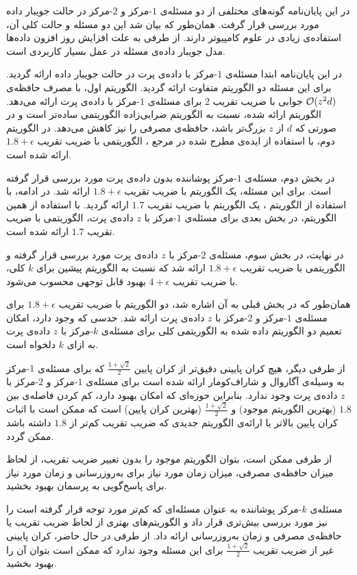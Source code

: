 

در این پایان‌نامه گونه‌های مختلفی از دو مسئله‌ی $1$-مرکز‌ و $2$-مرکز در حالت‌ جویبار داده  مورد بررسی قرار گرفت. همان‌طور که بیان شد این دو مسئله و حالت کلی آن، استفاده‌ی زیادی در علوم کامپیوتر دارند. از طرفی به علت افزایش روز افزون داده‌ها مدل‌ جویبار داده‌ی مسئله در عمل بسیار کاربردی است.

در این پایان‌نامه ابتدا مسئله‌ی $1$-مرکز با داده‌ی پرت در حالت جویبار داده ارائه گردید. برای این مسئله دو الگوریتم متفاوت ارائه گردید. الگوریتم اول، با مصرف حافظه‌ی $\mathcal{O}(z^2d)$ جوابی با ضریب تقریب $2$ برای مسئله‌ی $1$-مرکز با داده‌ی پرت ارائه می‌دهد. الگوریتم ارائه شده، نسبت به الگوریتم ضرابی‌زاده  الگوریتمی ساده‌تر است و در صورتی که $d$ از $z$ بزرگ‌تر باشد، حافظه‌ی مصرفی را نیز کاهش می‌دهد. در الگوریتم دوم، با استفاده از ایده‌ی مطرح شده در مرجع ، الگوریتمی با ضریب تقریب $1.8 + \epsilon$ ارائه شده است.

در بخش دوم، مسئله‌ی $1$-مرکز پوشاننده بدون داده‌ی پرت مورد بررسی قرار گرفته است. برای این مسئله، یک الگوریتم با ضریب تقریب $1.8 + \epsilon$ ارائه شد. در ادامه، با استفاده از الگوریتم ، یک الگوریتم با ضریب تقریب $1.7$ ارائه گردید. با استفاده از همین الگوریتم، در بخش بعدی برای مسئله‌ی $1$-مرکز با $z$ داده‌ی پرت، الگوریتمی با ضریب تقریب $1.7$ ارائه شده است.

در نهایت، در بخش سوم، مسئله‌ی $2$-مرکز با $z$ داده‌ی پرت مورد بررسی قرار گرفته و الگوریتمی با ضریب تقریب $1.8 + \epsilon$ ارائه شد که نسبت به الگوریتم پیشین برای $k$ کلی، با ضریب تقریب $4 + \epsilon$ بهبود قابل توجهی محسوب می‌شود.


همان‌طور که در بخش قبلی به آن اشاره شد، دو الگوریتم با ضریب تقریب $1.8 + \epsilon$ برای مسئله‌ی $1$-مرکز و $2$-مرکز با $z$ داده‌ی پرت ارائه شد.
حدسی که وجود دارد، امکان تعمیم دو الگوریتم داده شده به الگوریتمی کلی برای مسئله‌ی $k$-مرکز با $z$ داده‌ی پرت به ازای $k$ دلخواه است.

از طرفی دیگر، هیچ کران پایینی دقیق‌تر از کران پایین $\frac{1 + \sqrt{2}}{2}$ که برای مسئله‌ی $1$-مرکز به وسیله‌ی آگاروال و شاراف‌کومار ارائه شده است  برای مسئله‌ی $1$-مرکز و $2$-مرکز با $z$ داده‌ی پرت وجود ندارد.
بنابراین حوزه‌ای که امکان بهبود دارد، کم کردن فاصله‌ی بین $1.8$ (بهترین الگوریتم موجود) و $\frac{1 + \sqrt{2}}{2}$ (بهترین کران پایین) است که ممکن است با اثبات کران پایین بالا‌تر یا ارائه‌ی الگوریتم جدیدی که ضریب تقریب کم‌تر از $1.8$ داشته باشد ممکن گردد.

از طرفی ممکن است، بتوان الگوریتم موجود را بدون تغییر ضریب تقریب، از لحاظ میزان حافظه‌ی مصرفی، میزان زمان مورد نیاز برای به‌روزرسانی و زمان مورد نیاز برای پاسخ‌گویی به پرسمان بهبود بخشید.

مسئله‌ی $k$-مرکز پوشاننده به عنوان مسئله‌ای که کم‌تر مورد توجه قرار گرفته است را نیز مورد بررسی بیش‌تری قرار داد و الگوریتم‌های بهتری از لحاظ ضریب تقریب یا حافظه‌ی مصرفی و زمان به‌روزرسانی ارائه داد.
از طرفی در حال حاضر، کران پایینی غیر از ضریب تقریب $\frac{1 + \sqrt{2}}{2}$ برای این مسئله وجود ندارد که ممکن است بتوان آن را بهبود بخشید.
